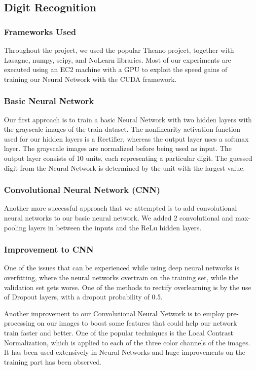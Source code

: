 \documentclass{article} %
\begin{document}
\subsection{Digit Recognition}
\subsubsection{Frameworks Used}
Throughout the project, we used the popular Theano project\cite{theano}, together with Lasagne\cite{lasagne}, numpy, scipy\cite{numpyscipy}, and NoLearn\cite{nolearn} libraries. Most of our experiments are executed using an EC2 machine with a GPU to exploit the speed gains of training our Neural Network with the CUDA framework.

\subsubsection{Basic Neural Network}
Our first approach is to train a basic Neural Network with two hidden layers with the grayscale images of the train dataset. The nonlinearity activation function used for our hidden layers is a Rectifier, whereas the output layer uses a softmax layer. The grayscale images are normalized before being used as input. The output layer consists of 10 units, each representing a particular digit. The guessed digit from the Neural Network is determined by the unit with the largest value.

\subsubsection{Convolutional Neural Network (CNN)}
Another more successful approach that we attempted is to add convolutional neural networks to our basic neural network. We added 2 convolutional and max-pooling layers in between the inputs and the ReLu hidden layers.


\subsubsection{Improvement to CNN}
One of the issues that can be experienced while using deep neural networks is overfitting, where the neural networks overtrain on the training set, while the validation set gets worse. One of the methods to rectify overlearning is by the use of Dropout layers, with a dropout probability of 0.5.

Another improvement to our Convolutional Neural Network is to employ pre-processing on our images to boost some features that could help our network train faster and better. One of the popular techniques is the Local Contrast Normalization, which is applied to each of the three color channels of the images. It has been used extensively in Neural Networks and huge improvements on the training part has been observed.
\end{document}

